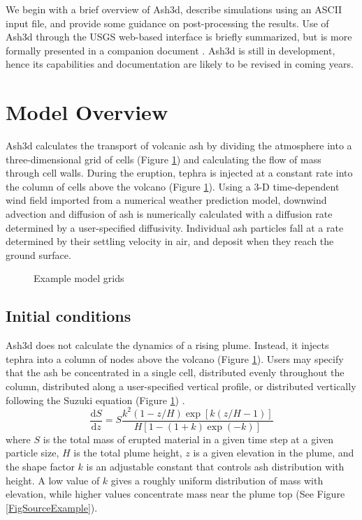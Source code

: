 We begin with a brief overview of Ash3d, describe simulations using an ASCII input
file, and provide some guidance on post-processing the results. Use of Ash3d through
the USGS web-based interface is briefly summarized, but is more formally presented
in a companion document \cite{Mastin2013a}. Ash3d is still in development, hence its
capabilities and documentation are likely to be revised in coming years.

\section{Model Overview}\label{ChapIntroSecModelOverview}
Ash3d calculates the transport of volcanic ash by dividing the atmosphere into a
three-dimensional grid of cells (Figure \ref{FigAsh3dGrid}) and calculating the
flow of mass through cell walls. During the eruption, tephra is injected at a constant
rate into the column of cells above the volcano (Figure \ref{FigAsh3dGrid}).
Using a 3-D time-dependent wind field imported from a numerical weather
prediction model, downwind advection and diffusion of ash is numerically calculated with a
diffusion rate determined by a user-specified diffusivity. Individual ash
particles fall at a rate determined by their settling velocity in air, and
deposit when they reach the ground surface.
\begin{figure}[htbp]
\parbox{15cm}{\caption{\label{FigAsh3dGrid}
Example model grids}}
\end{figure}

\subsection{Initial conditions}\label{ChapIntroSecInitCond}
Ash3d does not calculate the dynamics of a rising plume. Instead, it injects
tephra into a column of nodes above the volcano (Figure \ref{FigAsh3dGrid}).
Users may specify
that the ash be concentrated in a single cell, distributed evenly throughout
the column, distributed along a user-specified vertical profile, or distributed
vertically following the Suzuki equation
(Figure \ref{FigAsh3dGrid}) \cite{Carey1996,Suzuki1983}.
\begin{equation}
 \frac{\mathrm{d}S}{\mathrm{d}z} = S\frac{k^2\left( 1-z/H \right)\exp\left[k\left(z/H-1 \right) \right]}
 {H \left[1-\left(1+k \right)\exp \left( -k\right) \right]} \label{EqSuz}
\end{equation}
where $S$ is the total mass of erupted material in a given time step at a
given particle size, $H$ is the total plume height, $z$ is a given elevation
in the plume, and the shape factor $k$ is an adjustable constant that controls
ash distribution with height. A low value of $k$ gives a roughly uniform
distribution of mass with elevation, while higher values concentrate mass
near the plume top (See Figure \ref{FigSourceExample}).


